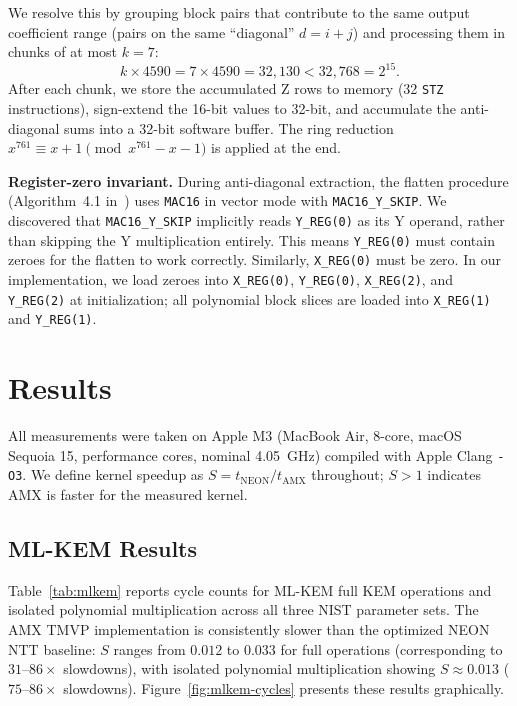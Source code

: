 \documentclass[utf8]{FrontiersinHarvard}
\begin{document}
We resolve this by grouping block pairs that contribute to the same output coefficient range (pairs on the same ``diagonal'' $d = i + j$) and processing them in chunks of at most $k = 7$:
\[
  k \times 4590 = 7 \times 4590 = 32{,}130 < 32{,}768 = 2^{15}.
\]
After each chunk, we store the accumulated Z rows to memory (32 \texttt{STZ} instructions), sign-extend the 16-bit values to 32-bit, and accumulate the anti-diagonal sums into a 32-bit software buffer. The ring reduction $x^{761} \equiv x + 1 \pmod{x^{761}-x-1}$ is applied at the end.

\textbf{Register-zero invariant.} During anti-diagonal extraction, the flatten procedure (Algorithm~4.1 in~\cite{gazzoni2024pqcamx}) uses \texttt{MAC16} in vector mode with \texttt{MAC16\_Y\_SKIP}. We discovered that \texttt{MAC16\_Y\_SKIP} implicitly reads \texttt{Y\_REG(0)} as its Y operand, rather than skipping the Y multiplication entirely. This means \texttt{Y\_REG(0)} must contain zeroes for the flatten to work correctly. Similarly, \texttt{X\_REG(0)} must be zero. In our implementation, we load zeroes into \texttt{X\_REG(0)}, \texttt{Y\_REG(0)}, \texttt{X\_REG(2)}, and \texttt{Y\_REG(2)} at initialization; all polynomial block slices are loaded into \texttt{X\_REG(1)} and \texttt{Y\_REG(1)}.


\section{Results}
\label{sec:results}

All measurements were taken on Apple M3 (MacBook Air, 8-core, macOS Sequoia 15, performance cores, nominal 4.05~GHz) compiled with Apple Clang \texttt{-O3}. We define kernel speedup as $S = t_{\text{NEON}} / t_{\text{AMX}}$ throughout; $S > 1$ indicates AMX is faster for the measured kernel.

\subsection{ML-KEM Results}

Table~\ref{tab:mlkem} reports cycle counts for ML-KEM full KEM operations and isolated polynomial multiplication across all three NIST parameter sets. The AMX TMVP implementation is consistently slower than the optimized NEON NTT baseline: $S$ ranges from $0.012$ to $0.033$ for full operations (corresponding to $31$--$86\times$ slowdowns), with isolated polynomial multiplication showing $S \approx 0.013$ ($75$--$86\times$ slowdowns). Figure~\ref{fig:mlkem-cycles} presents these results graphically.
\end{document}
